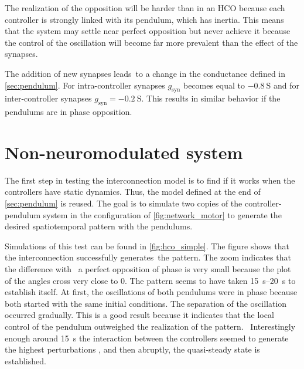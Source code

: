 The realization of the opposition will be harder than in an HCO because each controller is strongly linked with its pendulum, which has inertia.
This means that the system may settle near perfect opposition but never achieve it because the control of the oscillation will become far more prevalent than the effect of the synapses.

The addition of new synapses leads to a change in the conductance defined in \cref{sec:pendulum}.
For intra-controller synapses $g_\text{syn}$ becomes equal to $\qty{-0.8}{\siemens}$ and for inter-controller synapses $g_\text{syn} = \qty{-0.2}{\siemens}$.
This results in similar behavior if the pendulums are in phase opposition.



\section{Non-neuromodulated system}

The first step in testing the interconnection model is to find if it works when the controllers have static dynamics.
Thus, the model defined at the end of \cref{sec:pendulum} is reused.
The goal is to simulate two copies of the controller-pendulum system in the configuration of \cref{fig:network_motor} to generate the desired spatiotemporal pattern with the pendulums.

Simulations of this test can be found in \cref{fig:hco_simple}.
The figure shows that the interconnection successfully generates the pattern.
The zoom indicates that the difference with  a perfect opposition of phase is very small because the plot of the angles cross very close to 0.
The pattern seems to have taken \qtyrange{15}{20}{\second} to establish itself.
At first, the oscillations of both pendulums were in phase because both started with the same initial conditions.
The separation of the oscillation occurred gradually. This is a good result because it indicates that the local control of the pendulum outweighed the realization of the pattern. 
Interestingly enough around \qty{15}{\second} the interaction between the controllers seemed to generate the highest perturbations , and then abruptly, the quasi-steady state is established.

